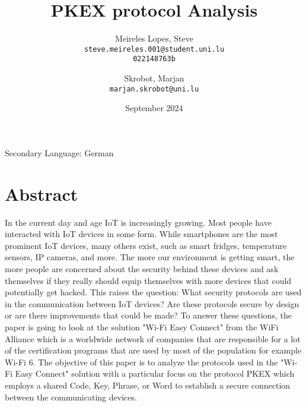 \documentclass[11pt,a4paper,english]{article}
\title{PKEX protocol Analysis}
\date{September 2024}
\author{
  Meireles Lopes, Steve\\
  \texttt{steve.meireles.001@student.uni.lu}\\
  \texttt{022148763b}
  \and
  Skrobot, Marjan\\
  \texttt{marjan.skrobot@uni.lu}
}
\begin{document}
\maketitle
Secondary Language: German
\section{Abstract}
In the current day and age IoT is increasingly growing. Most people have
interacted with IoT devices in some form. While smartphones are the most
prominent IoT devices, many others exist, such as smart fridges,
temperature sensors, IP cameras, and more. The more our environment is getting
smart, the more people are concerned about the security behind these devices
and ask themselves if they really should equip themselves with more devices
that could potentially get hacked. This raises the question: What security
protocols are used in the communication between IoT devices? Are these
protocols secure by design or are there improvements that could be made? To
answer these questions, the paper is going to look at the solution "Wi-Fi Easy
Connect" from the WiFi
Alliance\cite{easyconnect}\cite{alliance}\cite{wiki_alliance} which is a
worldwide network of companies that are responsible for a lot of the
certification programs that are used by most of the population for example
Wi-Fi 6\cite{wifi6}. The objective of this paper is to analyze the protocols
used in the "Wi-Fi Easy Connect" solution with a particular focus on the
protocol PKEX which employs a shared Code, Key, Phrase, or Word to establish a
secure connection between the communicating devices.

\printbibliography
\end{document}
